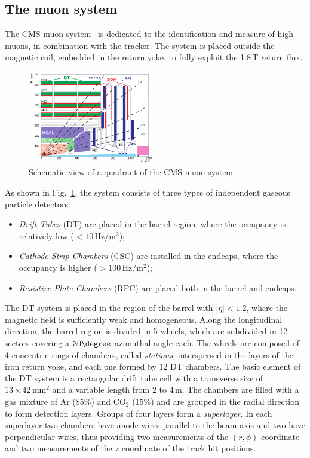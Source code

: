 \subsection{The muon system}\label{sec:muonsyst}
The CMS muon system~\cite{muon} is dedicated to the identification and measure of high \pt muons, in combination with the tracker. The system is placed outside the magnetic coil, embedded in the return yoke, to fully exploit the 1.8\,T return flux.
\begin{figure}[htb]
\centering
\includegraphics[width=0.5\textwidth]{images/muonsyst.png}
\caption{Schematic view of a quadrant of the CMS muon system.}\label{fig:muonsyst}
\end{figure}
As shown in Fig.~\ref{fig:muonsyst}, the system consists of three types of independent gaseous particle detectors:
\begin{itemize}
\item \emph{Drift Tubes} (DT) are placed in the barrel region, where the occupancy is relatively low ($< 10\,\mathrm{Hz/m^2}$);
\item \emph{Cathode Strip Chambers} (CSC) are installed in the endcaps, where the occupancy is higher ($> 100\,\mathrm{Hz/m^2}$);
\item \emph{Resistive Plate Chambers} (RPC) are placed both in the barrel and endcaps.
\end{itemize}
The DT system is placed in the region of the barrel with $|\eta|<1.2$, where the magnetic field is sufficiently weak and homogeneous. Along the longitudinal direction, the barrel region is divided in 5 wheels, which are subdivided in 12 sectors covering a $30\degree$ azimuthal angle each. The wheels are composed of 4 concentric rings of chambers, called \emph{stations}, interspersed in the layers of the iron return yoke, and each one formed by 12 DT chambers. The basic element of the DT system is a rectangular drift tube cell with a transverse size of $13\times42\,\mathrm{mm^2}$ and a variable length from 2 to 4\,m. The chambers are filled with a gas mixture of Ar (85\%) and $\mathrm{CO_2}$ (15\%) and are grouped in the radial direction to form detection layers. Groups of four layers form a \emph{superlayer}. In each superlayer two chambers have anode wires parallel to the beam axis and two have perpendicular wires, thus providing two measurements of the $(r,\phi)$ coordinate and two measurements of the $z$ coordinate of the track hit positions.
